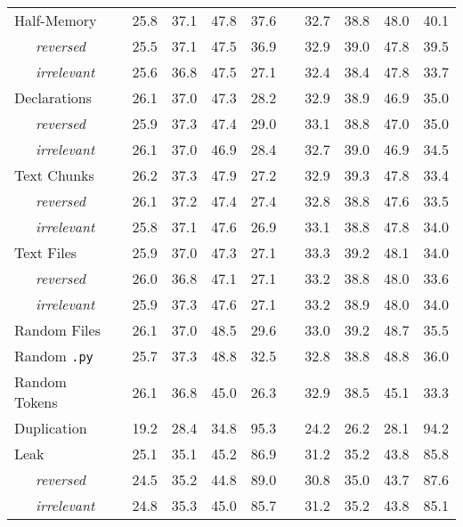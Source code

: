 \documentclass{standalone}
\begin{document}
\begin{table}
{\begin{tabular}{lc cc>{\columncolor{gray!30}}cc c cc>{\columncolor{gray!30}}cc}
        \cmidrule(lr){1-1}
        Half-Memory & & 25.8 & 37.1 & 47.8 & 37.6 & & 32.7 & 38.8 & 48.0 & 40.1 \\
        ~~~\textit{reversed} & & 25.5 & 37.1 & 47.5 & 36.9 & & 32.9 & 39.0 & 47.8 & 39.5 \\
        ~~~\textit{irrelevant} & & 25.6 & 36.8 & 47.5 & 27.1 & & 32.4 & 38.4 & 47.8 & 33.7 \\
        \cmidrule(lr){1-1}
        Declarations & & 26.1 & 37.0 & 47.3 & 28.2 & & 32.9 & 38.9 & 46.9 & 35.0 \\
        ~~~\textit{reversed} & & 25.9 & 37.3 & 47.4 & 29.0 & & 33.1 & 38.8 & 47.0 & 35.0 \\
        ~~~\textit{irrelevant} & & 26.1 & 37.0 & 46.9 & 28.4 & & 32.7 & 39.0 & 46.9 & 34.5 \\
        \cmidrule(lr){1-1}
        Text Chunks & & 26.2 & 37.3 & 47.9 & 27.2 & & 32.9 & 39.3 & 47.8 & 33.4 \\
        ~~~\textit{reversed} & & 26.1 & 37.2 & 47.4 & 27.4 & & 32.8 & 38.8 & 47.6 & 33.5 \\
        ~~~\textit{irrelevant} & & 25.8 & 37.1 & 47.6 & 26.9 & & 33.1 & 38.8 & 47.8 & 34.0 \\
        \cmidrule(lr){1-1}
        Text Files & & 25.9 & 37.0 & 47.3 & 27.1 & & 33.3 & 39.2 & 48.1 & 34.0 \\
        ~~~\textit{reversed} & & 26.0 & 36.8 & 47.1 & 27.1 & & 33.2 & 38.8 & 48.0 & 33.6 \\
        ~~~\textit{irrelevant} & & 25.9 & 37.3 & 47.6 & 27.1 & & 33.2 & 38.9 & 48.0 & 34.0 \\
        \cmidrule(lr){1-1}
        Random Files & & 26.1 & 37.0 & 48.5 & 29.6 & & 33.0 & 39.2 & 48.7 & 35.5 \\
        Random \texttt{.py} & & 25.7 & 37.3 & 48.8 & 32.5 & & 32.8 & 38.8 & 48.8 & 36.0 \\
        Random Tokens & & 26.1 & 36.8 & 45.0 & 26.3 & & 32.9 & 38.5 & 45.1 & 33.3 \\
        \midrule
        Duplication & & 19.2 & 28.4 & 34.8 & 95.3 & & 24.2 & 26.2 & 28.1 & 94.2 \\
        Leak & & 25.1 & 35.1 & 45.2 & 86.9 & & 31.2 & 35.2 & 43.8 & 85.8 \\
        ~~~\textit{reversed} & & 24.5 & 35.2 & 44.8 & 89.0 & & 30.8 & 35.0 & 43.7 & 87.6 \\
        ~~~\textit{irrelevant} & & 24.8 & 35.3 & 45.0 & 85.7 & & 31.2 & 35.2 & 43.8 & 85.1 \\
        
        \bottomrule
    \end{tabular}
}
\end{table}
\end{document}
